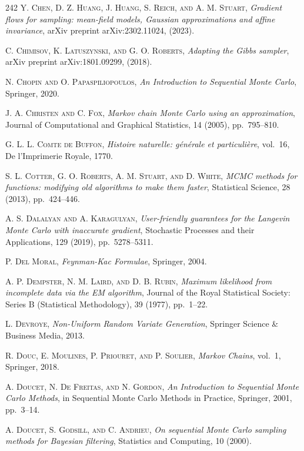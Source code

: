 \begin{thebibliography}{242}
\textsc{Y. Chen, D. Z. Huang, J. Huang, S. Reich, and A. M. Stuart},
\textit{Gradient flows for sampling: mean-field models, Gaussian approximations and affine invariance},
arXiv preprint arXiv:2302.11024, (2023).

\textsc{C. Chimisov, K. Latuszynski, and G. O. Roberts},
\textit{Adapting the Gibbs sampler},
arXiv preprint arXiv:1801.09299, (2018).

\textsc{N. Chopin and O. Papaspiliopoulos},
\textit{An Introduction to Sequential Monte Carlo},
Springer, 2020.

\textsc{J. A. Christen and C. Fox},
\textit{Markov chain Monte Carlo using an approximation},
Journal of Computational and Graphical Statistics, 14 (2005), pp.\ 795--810.

\textsc{G. L. L. Comte de Buffon},
\textit{Histoire naturelle: g\'en\'erale et particuli\`ere},
vol.\ 16, De l'Imprimerie Royale, 1770.

\textsc{S. L. Cotter, G. O. Roberts, A. M. Stuart, and D. White},
\textit{MCMC methods for functions: modifying old algorithms to make them faster},
Statistical Science, 28 (2013), pp.\ 424--446.

\textsc{A. S. Dalalyan and A. Karagulyan},
\textit{User-friendly guarantees for the Langevin Monte Carlo with inaccurate gradient},
Stochastic Processes and their Applications, 129 (2019), pp.\ 5278--5311.

\textsc{P. Del Moral},
\textit{Feynman-Kac Formulae},
Springer, 2004.

\textsc{A. P. Dempster, N. M. Laird, and D. B. Rubin},
\textit{Maximum likelihood from incomplete data via the EM algorithm},
Journal of the Royal Statistical Society: Series B (Statistical Methodology), 39 (1977), pp.\ 1--22.

\textsc{L. Devroye},
\textit{Non-Uniform Random Variate Generation},
Springer Science \& Business Media, 2013.

\textsc{R. Douc, E. Moulines, P. Priouret, and P. Soulier},
\textit{Markov Chains},
vol.\ 1, Springer, 2018.

\textsc{A. Doucet, N. De Freitas, and N. Gordon},
\textit{An Introduction to Sequential Monte Carlo Methods},
in Sequential Monte Carlo Methods in Practice, Springer, 2001, pp.\ 3--14.

\textsc{A. Doucet, S. Godsill, and C. Andrieu},
\textit{On sequential Monte Carlo sampling methods for Bayesian filtering},
Statistics and Computing, 10 (2000).


\end{thebibliography}
